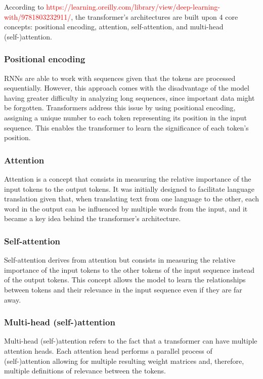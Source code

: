 According to \textcolor{red}{https://learning.oreilly.com/library/view/deep-learning-with/9781803232911/}, the transformer's architectures are built upon 4 core concepts: positional encoding, attention, self-attention, and multi-head (self-)attention.

\subsubsection{Positional encoding}

RNNs are able to work with sequences given that the tokens are processed sequentially. However, this approach comes with the disadvantage of the model having greater difficulty in analyzing long sequences, since important data might be forgotten. Transformers address this issue by using positional encoding, assigning a unique number to each token representing its position in the input sequence. This enables the transformer to learn the significance of each token's position.

\subsubsection{Attention}

Attention is a concept that consists in measuring the relative importance of the input tokens to the output tokens. It was initially designed to facilitate language translation given that, when translating text from one language to the other, each word in the output can be influenced by multiple words from the input, and it became a key idea behind the transformer's architecture.

\subsubsection{Self-attention}

Self-attention derives from attention but consists in measuring the relative importance of the input tokens to the other tokens of the input sequence instead of the output tokens. This concept allows the model to learn the relationships between tokens and their relevance in the input sequence even if they are far away.
 
\subsubsection{Multi-head (self-)attention}

Multi-head (self-)attention refers to the fact that a transformer can have multiple attention heads. Each attention head performs a parallel process of (self-)attention allowing for multiple resulting weight matrices and, therefore, multiple definitions of relevance between the tokens.

